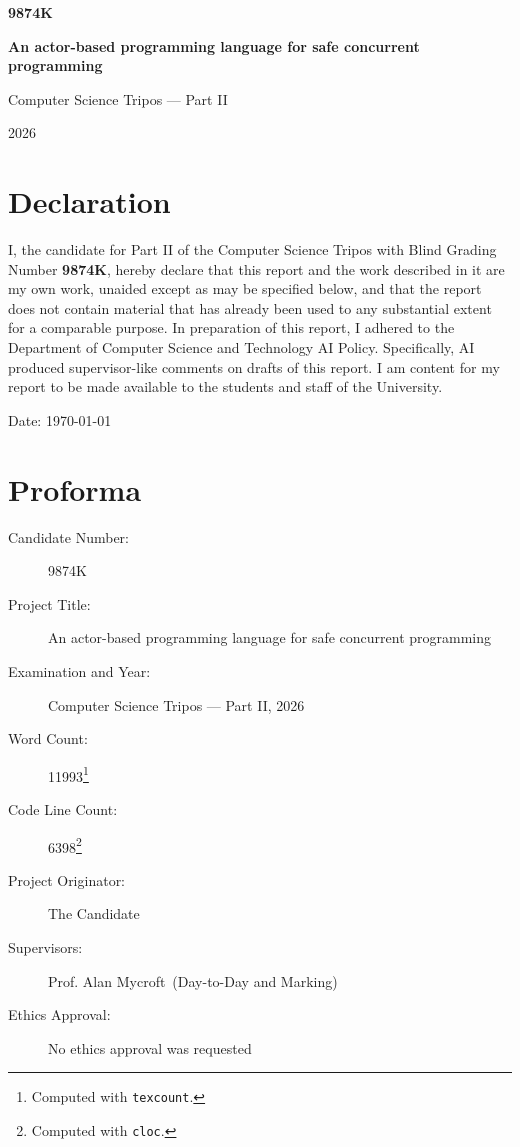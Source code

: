 \documentclass[a4paper,12pt,fleqn]{report} %
\newcommand{\myBGN}{9874K}
\newcommand{\myTitle}{An actor-based programming language for safe concurrent programming}
\newcommand{\myExam}{Computer Science Tripos --- Part II}
\newcommand{\myYear}{2026}
\newcommand{\myWordCount}{11993}
\newcommand{\myLinesOfCode}{6398}
\newcommand{\myOriginator}{The Candidate} %
\newcommand{\mySupervisor}{Prof. Alan Mycroft}
\newcommand{\myEthicsStatus}{No ethics approval was requested} %
\begin{document}
\begin{titlepage}
    \begin{flushright}
        \large \textbf{\myBGN}
    \end{flushright}
    
    \vspace{4cm}
    
    \begin{center}
        {\huge \textbf{\myTitle} \par}
        
        \vspace{3cm}
        
        {\large \myExam \par}
        
        \vspace{1cm}
        
        {\large \myYear \par}
    \end{center}
\end{titlepage}

\newpage
{}
\section*{Declaration}
\thispagestyle{plain}

I, the candidate for Part II of the Computer Science Tripos with Blind Grading Number \textbf{\myBGN}, hereby declare that this report and the work described in it are my own work, unaided except as may be specified below, and that the report does not contain material that has already been used to any substantial extent for a comparable purpose. In preparation of this report, I adhered to the Department of Computer Science and Technology AI Policy. Specifically, AI produced supervisor-like comments on drafts of this report. I am content for my report to be made available to the students and staff of the University.

\noindent Date: \today

\newpage

\section*{Proforma}
\thispagestyle{plain}

\begin{description}
    \item[Candidate Number:] \myBGN
    \item[Project Title:] \myTitle
    \item[Examination and Year:] \myExam, \myYear
    \item[Word Count:] \myWordCount\footnote{Computed with \texttt{texcount}.}
    \item[Code Line Count:] \myLinesOfCode\footnote{Computed with \texttt{cloc}.}
    \item[Project Originator:] \myOriginator
    \item[Supervisors:] \mySupervisor~(Day-to-Day and Marking)
    \item[Ethics Approval:] \myEthicsStatus
\end{description}
\end{document}
